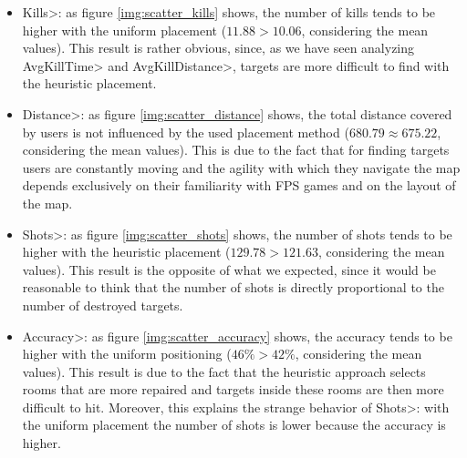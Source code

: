 \begin{itemize}
\item \<Kills>: as figure \ref{img:scatter_kills} shows, the number of kills tends to be higher with the uniform placement ($11.88 > 10.06$, considering the mean values). This result is rather obvious, since, as we have seen analyzing \<AvgKillTime> and \<AvgKillDistance>, targets are more difficult to find with the heuristic placement.
\item \<Distance>: as figure \ref{img:scatter_distance} shows, the total distance covered by users is not influenced by the used placement method ($680.79\approx675.22$, considering the mean values). This is due to the fact that for finding targets users are constantly moving and the agility with which they navigate the map depends exclusively on their familiarity with FPS games and on the layout of the map.
\item \<Shots>: as figure \ref{img:scatter_shots} shows, the number of shots tends to be higher with the heuristic placement ($129.78 >  121.63$, considering the mean values). This result is the opposite of what we expected, since it would be reasonable to think that the number of shots is directly proportional to the number of destroyed targets.
\item \<Accuracy>: as figure \ref{img:scatter_accuracy} shows, the accuracy tends to be higher with the uniform positioning ($46\% > 42\%$, considering the mean values). This result is due to the fact that the heuristic approach selects rooms that are more repaired and targets inside these rooms are then more difficult to hit. Moreover, this explains the strange behavior of \<Shots>: with the uniform placement the number of shots is lower because the accuracy is higher.
\end{itemize}

